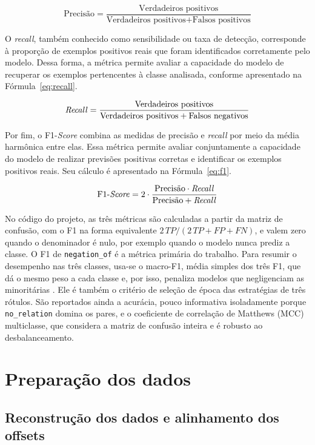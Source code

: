 \[
  \text{Precisão} =
  \frac{\text{Verdadeiros positivos}}
       {\text{Verdadeiros positivos} + \text{Falsos positivos}}
\]

O \emph{recall}, também conhecido como sensibilidade ou taxa de detecção, corresponde
à proporção de exemplos positivos reais que foram identificados corretamente pelo
modelo. Dessa forma, a métrica permite avaliar a capacidade do modelo de recuperar os
exemplos pertencentes à classe analisada, conforme apresentado na
Fórmula~\ref{eq:recall}.

\[
  \text{\emph{Recall}} =
  \frac{\text{Verdadeiros positivos}}
       {\text{Verdadeiros positivos} + \text{Falsos negativos}}
\]

Por fim, o F1-\emph{Score} combina as medidas de precisão e \emph{recall} por meio da
média harmônica entre elas. Essa métrica permite avaliar conjuntamente a capacidade do
modelo de realizar previsões positivas corretas e identificar os exemplos positivos
reais. Seu cálculo é apresentado na Fórmula~\ref{eq:f1}.

\[
  \text{F1-\emph{Score}} =
  2 \cdot \frac{\text{Precisão} \cdot \text{\emph{Recall}}}
               {\text{Precisão} + \text{\emph{Recall}}}
\]

No código do projeto, as três métricas são calculadas a partir da matriz de confusão,
com o F1 na forma equivalente $2\,TP/(2\,TP + FP + FN)$, e valem zero quando o
denominador é nulo, por exemplo quando o modelo nunca prediz a classe. O F1 de
\texttt{negation\_of} é a métrica primária do trabalho. Para resumir o
desempenho nas três classes, usa-se o macro-F1, média simples dos três F1,
que dá o mesmo peso a cada classe e, por isso, penaliza modelos que negligenciam as
minoritárias \cite{forman_2010_apples}. Ele é também o critério de seleção de época
das estratégias de três rótulos. São reportados ainda a acurácia, pouco informativa
isoladamente porque \texttt{no\_relation} domina os pares, e o coeficiente de
correlação de Matthews (MCC) multiclasse, que considera a matriz de confusão inteira e
é robusto ao desbalanceamento.

\section{Preparação dos dados}
\label{sec:preparacao}

\subsection{Reconstrução dos dados e alinhamento dos offsets}
\label{sec:parsing}

